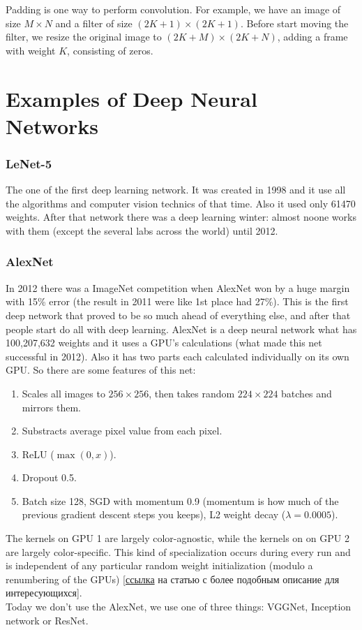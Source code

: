Padding is one way to perform convolution. For example, we have an image of size $M\times N$ and a filter of size $(2K+1)\times(2K+1)$. Before start moving the filter, we resize the original image to $(2K+M)\times(2K+N)$, adding a frame with weight $K$, consisting of zeros.

\section{Examples of Deep Neural Networks}
\vspace{-0.6cm}
\subsubsection*{LeNet-5}

The one of the first deep learning network. It was created in 1998 and it use all the algorithms and computer vision technics of that time. Also it used only 61470 weights. After that network there was a deep learning winter: almost noone works with them (except the several labs across the world) until 2012.

\subsubsection*{AlexNet}

In 2012 there was a ImageNet competition when AlexNet won by a huge margin with 15\% error (the result in 2011 were like 1st place had 27\%). This is the first deep network that proved to be so much ahead of everything else, and after that people start do all with deep learning.
AlexNet is a deep neural network what has 100,207,632 weights and it uses a GPU's calculations (what made this net successful in 2012). Also it has two parts each calculated individually on its own GPU. So there are some features of this net:\\
\begin{enumerate}[label=$\bullet$]
  \item Scales all images to $256\times256$, then takes random $224\times224$ batches and mirrors them.
  \item Substracts average pixel value from each pixel.
  \item ReLU ($\max(0,x)$).
  \item Dropout 0.5.
  \item Batch size 128, SGD with momentum 0.9 (momentum is how much of the previous gradient descent steps you keeps), L2 weight decay ($\lambda=0.0005$).
\end{enumerate}
The kernels on GPU 1 are largely color-agnostic, while the kernels on on GPU 2 are largely color-specific. This kind of specialization occurs during every run and is independent of any particular random weight initialization (modulo a renumbering of the GPUs) [\href{https://www.nvidia.cn/content/tesla/pdf/machine-learning/imagenet-classification-with-deep-convolutional-nn.pdf}{ссылка} на статью с более подобным описание для интересующихся].\\
Today we don't use the AlexNet, we use one of three things: VGGNet, Inception network or ResNet.

